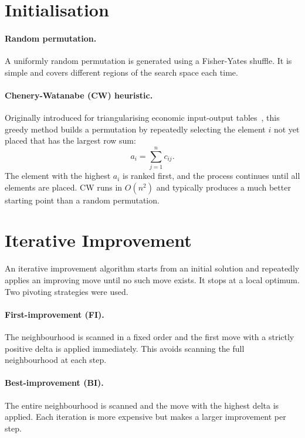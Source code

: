 \section{Initialisation}

\paragraph{Random permutation.} A uniformly random permutation is generated
using a Fisher-Yates shuffle. It is simple and covers different regions of the
search space each time.

\paragraph{Chenery-Watanabe (CW) heuristic.} Originally introduced for
triangularising economic input-output tables~\cite{CheWat58}, this greedy
method builds a permutation by repeatedly selecting the element $i$ not yet
placed that has the largest row sum:
\begin{equation}
    a_i = \sum_{j=1}^{n} c_{ij}.
    \label{eq:cw}
\end{equation}
The element with the highest $a_i$ is ranked first, and the process continues
until all elements are placed. CW runs in $O(n^2)$ and typically produces a
much better starting point than a random permutation.

\section{Iterative Improvement}

An iterative improvement algorithm starts from an initial solution and
repeatedly applies an improving move until no such move exists. It stops at a
local optimum. Two pivoting strategies were used.

\paragraph{First-improvement (FI).} The neighbourhood is scanned in a fixed
order and the first move with a strictly positive delta is applied immediately.
This avoids scanning the full neighbourhood at each step.

\paragraph{Best-improvement (BI).} The entire neighbourhood is scanned and the
move with the highest delta is applied. Each iteration is more expensive but
makes a larger improvement per step.

